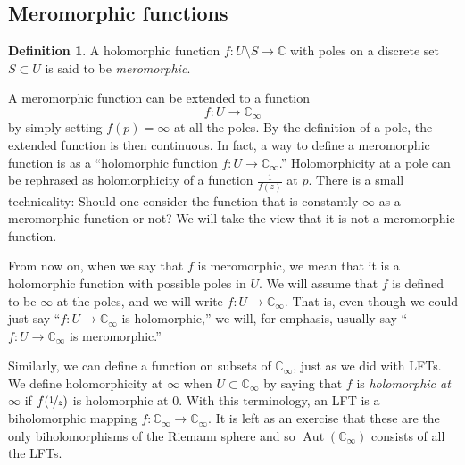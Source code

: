 \documentclass[12pt,openany]{book}
\newcommand{\Aut}{\operatorname{Aut}}
\newcommand{\C}{{\mathbb{C}}}
\newcommand{\myindex}[1]{#1\index{#1}}
\newcommand{\myquote}[1]{``#1''}
\theoremstyle{plain}
\theoremstyle{remark}
\theoremstyle{definition}
\newtheorem{defn}[thm]{Definition}
\theoremstyle{exercise}
\theoremstyle{example}
\begin{document}

\subsection{Meromorphic functions}
\label{subsec:meromorphic}

\begin{defn}
A holomorphic function $f \colon U \setminus S \to \C$ with poles on a
discrete set $S \subset U$ is said to be \emph{\myindex{meromorphic}}.
\end{defn}

A meromorphic function can be extended to a function
\begin{equation*}
f \colon U \to \C_{\infty}
\end{equation*}
by simply setting $f(p) = \infty$ at all the poles.
By the definition of a pole, the extended function is then continuous.
In fact, a way to define
a meromorphic function is as a
\myquote{holomorphic function $f \colon U \to \C_{\infty}$.}
Holomorphicity at a pole can be
rephrased as holomorphicity of a function $\frac{1}{f(z)}$ at $p$.
There is a small technicality: Should one consider the function
that is constantly $\infty$ as a meromorphic function or not?
We will take the view that it is not a meromorphic function.

From now on, when we say that $f$ is
meromorphic, we mean that it is a holomorphic function with possible
poles in $U$.  We will assume that $f$ is defined to be $\infty$
at the poles, and
we will write $f \colon U \to \C_\infty$.  That is, even though we
could just say \myquote{$f \colon U \to \C_\infty$ is holomorphic,} we will, for emphasis,
usually say \myquote{$f \colon U \to \C_\infty$ is meromorphic.}

Similarly, we can define a function on subsets of $\C_\infty$, just as
we did with LFTs.
We define holomorphicity at $\infty$ when $U \subset
\C_\infty$ by saying that $f$ is \emph{\myindex{holomorphic at $\infty$}}
if $f(\nicefrac{1}{z})$ is holomorphic at $0$.
With this terminology, an LFT is a biholomorphic mapping $f \colon
\C_\infty \to \C_\infty$.  It is left as an exercise that
these are the only biholomorphisms of the Riemann sphere and so
$\Aut(\C_\infty)$ consists of all the LFTs.
\end{document}
